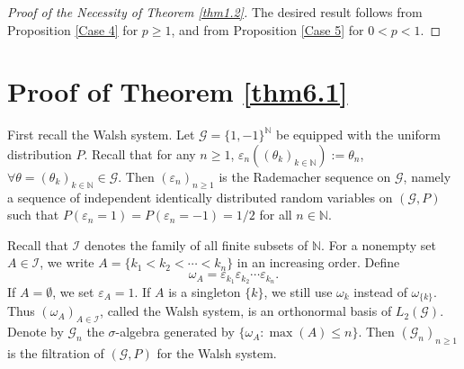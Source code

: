 \documentclass[oneside,english,a4wide]{amsart}
\numberwithin{equation}{section}
\numberwithin{figure}{section}
\theoremstyle{plain}
\theoremstyle{plain}
\theoremstyle{definition}
\theoremstyle{plain}
\theoremstyle{remark}
\theoremstyle{definition}
\theoremstyle{remark}
\theoremstyle{definition}
\newcommand{\8}{\infty}
\begin{document}
\begin{proof}[Proof of the Necessity of Theorem \ref{thm1.2}]
	The desired result follows from Proposition \ref{Case 4} for $p\geq 1$, and from Proposition \ref{Case 5} for $0<p<1$.
\end{proof}


\bigskip


\section{Proof of Theorem \ref{thm6.1}}\label{Application 1:the CAR case}
	First recall the Walsh system. Let $\mathcal{G}=\{1,-1\}^{\mathbb{N}}$ be equipped with the uniform distribution $P$. Recall that for any $n\geq 1$, $\varepsilon_n((\theta_k)_{k\in \mathbb{N}}):= \theta_n $, $\forall \theta=(\theta_k)_{k\in \mathbb{N}}\in \mathcal{G}$. Then $(\varepsilon_n)_{n\geq 1}$ is the Rademacher sequence on $\mathcal{G}$, namely a sequence of independent identically distributed random variables on $(\mathcal{G},P)$ such that $P(\varepsilon_n=1)=P(\varepsilon_n=-1)=1/2$ for all $n\in\mathbb{N}$. 
	
	Recall that $\mathcal{I}$ denotes the family of all finite subsets of $\mathbb{N}$. For a nonempty set $A\in\mathcal{I}$, we write $A=\{k_1<k_2<\cdots<k_n\}$ in an increasing order. Define
	\begin{equation*}
		\omega_A=\varepsilon_{k_1}\varepsilon_{k_2}\cdots\varepsilon_{k_n}.
	\end{equation*}
	If $A=\emptyset$, we set $\varepsilon_A=1$. If $A$ is a singleton $\{k\}$, we still use $\omega_k$ instead of $\omega_{\{k\}}$. Thus $(\omega_A)_{A\in \mathcal{I}}$, called the Walsh system, is an orthonormal basis of $L_2(\mathcal{G})$. Denote by $\mathcal{G}_n$ the $\sigma$-algebra generated by $\{\omega_A : {\max (A)\le n}\}$. Then $(\mathcal{G}_n)_{n\geq 1}$ is the filtration of $(\mathcal{G}, P)$ for the Walsh system.
	
\end{document}
